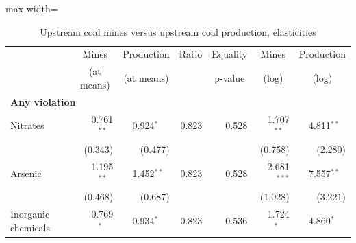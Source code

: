 \begin{table}[htbp]
\raggedright
\begin{minipage}{\linewidth}
\caption{\label{tab:scaled_compare_elas_k2} Upstream coal mines versus upstream coal production, elasticities}
\end{minipage}
\small
{\setlength{\tabcolsep}{4pt}%
\begin{adjustbox}{max width=\linewidth}
\begin{tabular}{lrrrrrr}
\toprule
 & \multicolumn{1}{c}{Mines} & \multicolumn{1}{c}{Production} & \multicolumn{1}{c}{Ratio} & \multicolumn{1}{c}{Equality} & \multicolumn{1}{c}{Mines} & \multicolumn{1}{c}{Production} \\
 & \multicolumn{1}{c}{(at means)} & \multicolumn{1}{c}{(at means)} & \multicolumn{1}{c}{} & \multicolumn{1}{c}{p-value} & \multicolumn{1}{c}{(log)} & \multicolumn{1}{c}{(log)} \\
\hline
\multicolumn{7}{l}{\textbf{Any violation}} \\
Nitrates & \phantom{(}\phantom{-}0.761$^{**\phantom{*}}$ & \phantom{(}\phantom{-}0.924$^{*\phantom{*}\phantom{*}}$ & \phantom{(}\phantom{-}0.823\phantom{$^{***}$} & \phantom{(}\phantom{-}0.528\phantom{$^{***}$} & \phantom{(}\phantom{-}\phantom{0}1.707$^{**\phantom{*}}$ & \phantom{(}\phantom{-}\phantom{0}4.811$^{**\phantom{*}}$ \\
 & (\phantom{-}0.343)\phantom{$^{***}$} & (\phantom{-}0.477)\phantom{$^{***}$} &  &  & (\phantom{-}\phantom{0}0.758)\phantom{$^{***}$} & (\phantom{-}\phantom{0}2.280)\phantom{$^{***}$} \\
Arsenic & \phantom{(}\phantom{-}1.195$^{**\phantom{*}}$ & \phantom{(}\phantom{-}1.452$^{**\phantom{*}}$ & \phantom{(}\phantom{-}0.823\phantom{$^{***}$} & \phantom{(}\phantom{-}0.528\phantom{$^{***}$} & \phantom{(}\phantom{-}\phantom{0}2.681$^{***}$ & \phantom{(}\phantom{-}\phantom{0}7.557$^{**\phantom{*}}$ \\
 & (\phantom{-}0.468)\phantom{$^{***}$} & (\phantom{-}0.687)\phantom{$^{***}$} &  &  & (\phantom{-}\phantom{0}1.028)\phantom{$^{***}$} & (\phantom{-}\phantom{0}3.221)\phantom{$^{***}$} \\
Inorganic chemicals & \phantom{(}\phantom{-}0.769$^{*\phantom{*}\phantom{*}}$ & \phantom{(}\phantom{-}0.934$^{*\phantom{*}\phantom{*}}$ & \phantom{(}\phantom{-}0.823\phantom{$^{***}$} & \phantom{(}\phantom{-}0.536\phantom{$^{***}$} & \phantom{(}\phantom{-}\phantom{0}1.724$^{*\phantom{*}\phantom{*}}$ & \phantom{(}\phantom{-}\phantom{0}4.860$^{*\phantom{*}\phantom{*}}$ \\

\end{tabular}
\end{adjustbox}}
\end{table}
